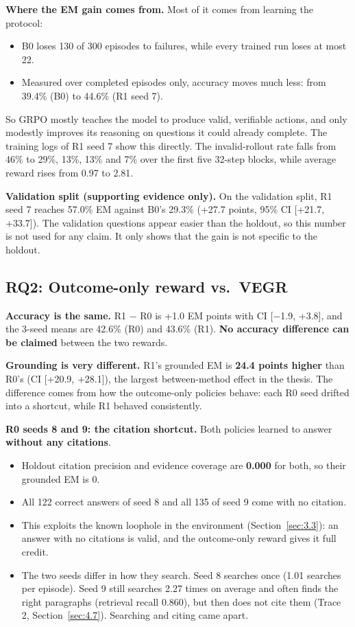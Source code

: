 \textbf{Where the EM gain comes from.} Most of it comes from learning
the protocol:

\begin{itemize}
\tightlist
\item
  B0 loses 130 of 300 episodes to failures, while every trained run
  loses at most 22.
\item
  Measured over completed episodes only, accuracy moves much less: from
  39.4\% (B0) to 44.6\% (R1 seed 7).
\end{itemize}

So GRPO mostly teaches the model to produce valid, verifiable actions,
and only modestly improves its reasoning on questions it could already
complete. The training logs of R1 seed 7 show this directly. The
invalid-rollout rate falls from 46\% to 29\%, 13\%, 13\% and 7\% over
the first five 32-step blocks, while average reward rises from 0.97 to
2.81.

\textbf{Validation split (supporting evidence only).} On the validation
split, R1 seed 7 reaches 57.0\% EM against B0's 29.3\% (+27.7 points,
95\% CI {[}+21.7, +33.7{]}). The validation questions appear easier than
the holdout, so this number is not used for any claim. It only shows
that the gain is not specific to the holdout.

\subsection{RQ2: Outcome-only reward vs.~VEGR}\label{sec:4.4}

\textbf{Accuracy is the same.} R1 − R0 is +1.0 EM points with CI
{[}−1.9, +3.8{]}, and the 3-seed means are 42.6\% (R0) and 43.6\% (R1).
\textbf{No accuracy difference can be claimed} between the two rewards.

\textbf{Grounding is very different.} R1's grounded EM is \textbf{24.4
points higher} than R0's (CI {[}+20.9, +28.1{]}), the largest
between-method effect in the thesis. The difference comes from how the
outcome-only policies behave: each R0 seed drifted into a shortcut,
while R1 behaved consistently.

\textbf{R0 seeds 8 and 9: the citation shortcut.} Both policies learned
to answer \textbf{without any citations}.

\begin{itemize}
\tightlist
\item
  Holdout citation precision and evidence coverage are \textbf{0.000}
  for both, so their grounded EM is 0.
\item
  All 122 correct answers of seed 8 and all 135 of seed 9 come with no
  citation.
\item
  This exploits the known loophole in the environment
  (Section~\ref{sec:3.3}): an answer with no citations is valid, and the
  outcome-only reward gives it full credit.
\item
  The two seeds differ in how they search. Seed 8 searches once (1.01
  searches per episode). Seed 9 still searches 2.27 times on average and
  often finds the right paragraphs (retrieval recall 0.860), but then
  does not cite them (Trace 2, Section~\ref{sec:4.7}). Searching and
  citing came apart.
\end{itemize}


